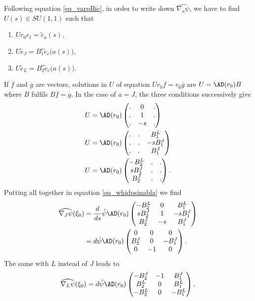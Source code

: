 Following equation \eqref{eq_varpBic}, in order to write down $\widehat{\nabla_a\psi}$, we have to find $U(s)\in SU(1,1)$ such that
\begin{enumerate}
\item $Ur_0e_t=\tilde{e}_a(s)$,
\item $U\tilde{e}_J=B^c_1\tilde{e}_c\big( a(s) \big)$,
\item $U\tilde{e}_L=B^c_2\tilde{e}_c\big( a(s) \big)$.
\end{enumerate}
If $\overline{ f }$ and $\overline{ g }$ are vectors, solutions in $U$ of equation $Ur_0\overline{ f }=r_0\overline{ g }$ are $U=\AD(r_0)B$ where $B$ fulfils $B\overline{ f }=\overline{ g }$. In the case of $a=J$, the three conditions successively give
\begin{subequations}
\begin{align}
U&=\AD(r_0)\begin{pmatrix}
.&0&.\\
.&1&.\\
.&-s&.
\end{pmatrix}\\
U&=\AD(r_0)\begin{pmatrix}
.&.&B_1^L\\
.&.&-sB_1^J\\
.&.&B_1^J
\end{pmatrix}\\
U&=\AD(r_0)\begin{pmatrix}
-B^L_2&.&.\\
sB_2^J&.&.\\
B_2^J&.&.
\end{pmatrix}.
\end{align}
\end{subequations}
Putting all together in equation \eqref{eq_whidpsinabla} we find
\begin{equation} \label{eq_nabJmoi}
\begin{split}
  \widehat{\nabla_J\psi}(\xi_0)&=\frac{ d }{ ds }\hat{\psi}\AD(r_0)
\begin{pmatrix}
-B_2^L  &   0   &   B_1^L\\
sB_2^J  &   1   &   -sB_1^J\\
B_2^J   &   -s  &   B_1^J
\end{pmatrix}\\
    &=d\hat{\psi}\AD(r_0)\begin{pmatrix}
0&0&0\\
B_2^J&0&-B_1^J\\
0&-1&0
\end{pmatrix}.
\end{split}
\end{equation}
The same with $L$ instead of $J$ leads to
\begin{equation} \label{eq_nabLmoi}
\widehat{\nabla_L \psi}(\xi_0)=d\hat{\psi}\AD(r_0)\begin{pmatrix}
-B_2^J&-1&B_1^J\\
B_2^L&0&B_1^L\\
-B_2^L&0&-B_1^L
\end{pmatrix}.
\end{equation}

